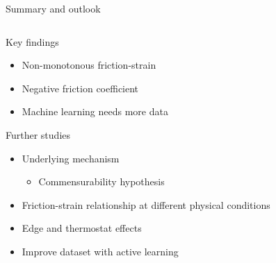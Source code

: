 \documentclass[
	10pt, %
]{beamer}
\begin{document}
\begin{frame}{Summary and outlook}


	\begin{columns} 
		\begin{column}{.5\textwidth}
			Key findings		
			\begin{itemize}
				\item Non-monotonous friction-strain
				\item Negative friction coefficient
				\item Machine learning needs more data
			\end{itemize}
			\vspace*{5mm}
			Further studies
			\begin{itemize}
				\item Underlying mechanism
				\begin{itemize}
					\item Commensurability hypothesis
				\end{itemize}
				\item Friction-strain relationship at different physical conditions
				\item Edge and thermostat effects
				\item Improve dataset with active learning 
			\end{itemize}
		\end{column}
		\begin{column}{.5\textwidth}


\end{column}
\end{columns}
\end{frame}
\end{document}
